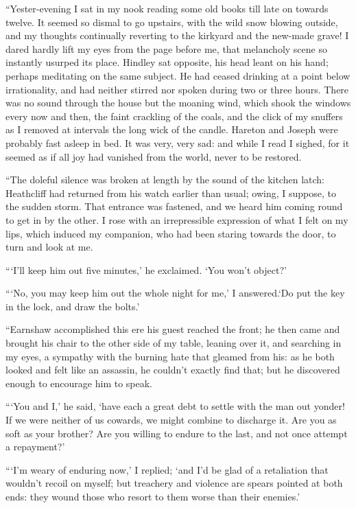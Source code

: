 \par “Yester-evening I sat in my nook reading some old books till late on towards twelve. It seemed so dismal to go upstairs, with the wild snow blowing outside, and my thoughts continually reverting to the kirkyard and the new-made grave! I dared hardly lift my eyes from the page before me, that melancholy scene so instantly usurped its place. Hindley sat opposite, his head leant on his hand; perhaps meditating on the same subject. He had ceased drinking at a point below irrationality, and had neither stirred nor spoken during two or three hours. There was no sound through the house but the moaning wind, which shook the windows every now and then, the faint crackling of the coals, and the click of my snuffers as I removed at intervals the long wick of the candle. Hareton and Joseph were probably fast asleep in bed. It was very, very sad: and while I read I sighed, for it seemed as if all joy had vanished from the world, never to be restored.
\par “The doleful silence was broken at length by the sound of the kitchen latch: Heathcliff had returned from his watch earlier than usual; owing, I suppose, to the sudden storm. That entrance was fastened, and we heard him coming round to get in by the other. I rose with an irrepressible expression of what I felt on my lips, which induced my companion, who had been staring towards the door, to turn and look at me.
\par “‘I'll keep him out five minutes,’ he exclaimed. ‘You won't object?’
\par “‘No, you may keep him out the whole night for me,’ I answered.‘Do put the key in the lock, and draw the bolts.’
\par “Earnshaw accomplished this ere his guest reached the front; he then came and brought his chair to the other side of my table, leaning over it, and searching in my eyes, a sympathy with the burning hate that gleamed from his: as he both looked and felt like an assassin, he couldn't exactly find that; but he discovered enough to encourage him to speak.
\par “‘You and I,’ he said, ‘have each a great debt to settle with the man out yonder! If we were neither of us cowards, we might combine to discharge it. Are you as soft as your brother? Are you willing to endure to the last, and not once attempt a repayment?’
\par “‘I'm weary of enduring now,’ I replied; ‘and I'd be glad of a retaliation that wouldn't recoil on myself; but treachery and violence are spears pointed at both ends: they wound those who resort to them worse than their enemies.’
